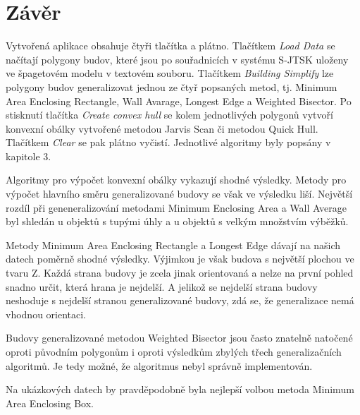\documentclass[11pt]{article}
\begin{document}
	\section{Závěr}

	Vytvořená aplikace obsahuje čtyři tlačítka a plátno. Tlačítkem \textit{Load Data} se načítají polygony budov, které jsou po souřadnicích v systému S-JTSK uloženy ve špagetovém modelu v textovém souboru. Tlačítkem \textit{Building Simplify} lze polygony budov generalizovat jednou ze čtyř popsaných metod, tj. Minimum Area Enclosing Rectangle, Wall Avarage, Longest Edge a Weighted Bisector. Po stisknutí tlačítka \textit{Create convex hull} se kolem jednotlivých polygonů vytvoří konvexní obálky vytvořené metodou Jarvis Scan či metodou Quick Hull. Tlačítkem \textit{Clear} se pak plátno vyčistí. Jednotlivé algoritmy byly popsány v kapitole 3.
	
	Algoritmy pro výpočet konvexní obálky vykazují shodné výsledky. Metody pro výpočet hlavního směru generalizované budovy se však ve výsledku liší.
	Největší rozdíl při geneneralizování metodami Minimum Enclosing Area a Wall Average byl shledán u objektů s tupými úhly a u objektů s velkým množstvím výběžků.
	
	Metody Minimum Area Enclosing Rectangle a Longest Edge dávají na našich datech poměrně shodné výsledky. Výjimkou je však budova s největší plochou ve tvaru Z. Každá strana budovy je zcela jinak orientovaná a nelze na první pohled snadno určit, která hrana je nejdelší. A jelikož se nejdelší strana budovy neshoduje s nejdelší stranou generalizované budovy, zdá se, že generalizace nemá vhodnou orientaci.
	
	Budovy generalizované metodou Weighted Bisector jsou často znatelně natočené oproti původním polygonům i oproti výsledkům zbylých třech generalizačních algoritmů. Je tedy možné, že algoritmus nebyl správně implementován.
	
	Na ukázkových datech by pravděpodobně byla nejlepší volbou metoda Minimum Area Enclosing Box. 
	


		
	
\end{document}

